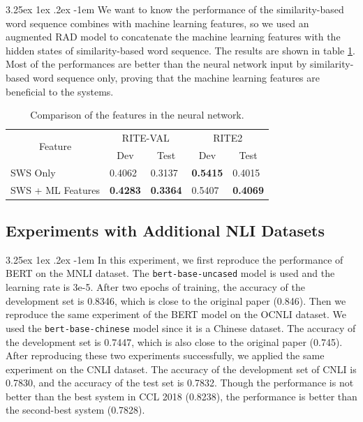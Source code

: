 \documentclass[12pt]{article}
\makeatletter
\renewcommand\paragraph{\@startsection{paragraph}{5}{\z@}%
  {3.25ex \@plus1ex \@minus.2ex}%
  {-1em}%
  {\normalfont\normalsize\bfseries}}
\makeatother
\begin{document}
\begin{CJK*}{UTF8}{bkai}
\begin{spacing}{1.77}
\paragraph{}
We want to know the performance of the similarity-based word sequence combines with machine learning features, so we used an augmented RAD model to concatenate the machine learning features with the hidden states of similarity-based word sequence. The results are shown in table \ref{result:csa_nn}. Most of the performances are better than the neural network input by similarity-based word sequence only, proving that the machine learning features are beneficial to the systems.

\begin{table}[H]
  \centering
  \setlength{\extrarowheight}{-3pt}
  \caption{Comparison of the features in the neural network.}
  \label{result:csa_nn}
  \begin{tabular}{|l|l|l|l|l|}
  \hline
  \multicolumn{1}{|c|}{\multirow{2}{*}{Feature}} & \multicolumn{2}{c|}{RITE-VAL} & \multicolumn{2}{c|}{RITE2} \\ \cline{2-5}
  \multicolumn{1}{|c|}{} & \multicolumn{1}{c|}{Dev} & \multicolumn{1}{c|}{Test} & \multicolumn{1}{c|}{Dev} & \multicolumn{1}{c|}{Test} \\ \hline
  SWS Only & 0.4062 & 0.3137 & \textbf{0.5415} & 0.4015 \\ \hline
  SWS   + ML Features & \textbf{0.4283} & \textbf{0.3364} & 0.5407 & \textbf{0.4069} \\ \hline
  \end{tabular}
\end{table}

\subsection{Experiments with Additional NLI Datasets}
\paragraph{}
In this experiment, we first reproduce the performance of BERT on the MNLI dataset. The \texttt{bert-base-uncased} model is used and the learning rate is 3e-5. After two epochs of training, the accuracy of the development set is 0.8346, which is close to the original paper (0.846). Then we reproduce the same experiment of the BERT model on the OCNLI dataset. We used the \texttt{bert-base-chinese} model since it is a Chinese dataset. The accuracy of the development set is 0.7447, which is also close to the original paper (0.745). After reproducing these two experiments successfully, we applied the same experiment on the CNLI dataset. The accuracy of the development set of CNLI is 0.7830, and the accuracy of the test set is 0.7832. Though the performance is not better than the best system in CCL 2018 (0.8238), the performance is better than the second-best system (0.7828).


\end{spacing}
\end{CJK*}
\end{document}
